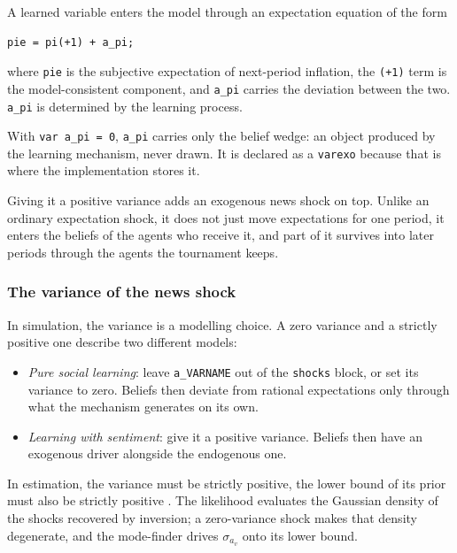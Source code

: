 \documentclass[11pt,a4paper]{article}
\newcommand{\command}[1]{\texttt{#1}}
\begin{document}
A learned variable enters the model through an expectation equation of the
form 
 
\begin{lstlisting}[style=dynare]
pie = pi(+1) + a_pi;
\end{lstlisting}
 
\noindent
where \texttt{pie} is the subjective expectation of next-period inflation, the
\texttt{(+1)} term is the model-consistent component, and \texttt{a\_pi} carries
the deviation between the two. \texttt{a\_pi} is determined by the learning
process.

\noindent
With \texttt{var a\_pi = 0}, \texttt{a\_pi} carries only the belief wedge: an
object produced by the learning mechanism, never drawn. It is declared as a
\command{varexo} because that is where the implementation stores it.

\noindent
Giving it a positive variance adds an exogenous news shock on top. Unlike an
ordinary expectation shock, it does not just move expectations for one period,
it enters the beliefs of the agents who receive it, and part of it survives
into later periods through the agents the tournament keeps.
 
\subsubsection{The variance of the news shock}
\label{sec:declaration:newsvariance}

In simulation, the variance is a modelling choice. A zero variance and a
strictly positive one describe two different models:

\begin{itemize}[leftmargin=2em]
\item \emph{Pure social learning}: leave \texttt{a\_VARNAME} out of the
      \command{shocks} block, or set its variance to zero. Beliefs then
      deviate from rational expectations only through what the mechanism
      generates on its own. 
\item \emph{Learning with sentiment}: give it a positive variance. Beliefs
      then have an exogenous driver alongside the endogenous one.
\end{itemize}

In estimation, the variance must be strictly positive, the lower
bound of its prior must also be strictly positive . The likelihood evaluates the Gaussian density of the shocks recovered by inversion; a zero-variance shock makes that density degenerate, and
the mode-finder drives $\sigma_{a_v}$ onto its lower bound.
\end{document}
